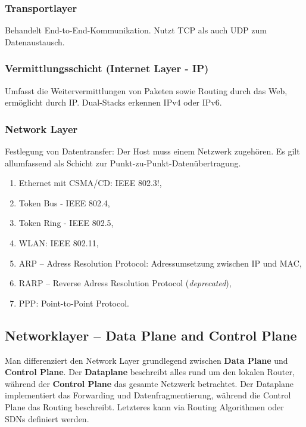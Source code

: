 \documentclass{scrartcl}
\begin{document}
    \subsubsection{Transportlayer}
    \label{TCP/IP:transport_layer}
    Behandelt End-to-End-Kommunikation. Nutzt TCP als auch UDP zum Datenaustausch. 
    
    \subsubsection{Vermittlungsschicht (Internet Layer - IP)}
    \label{TCP/IP:ip_layer}
    Umfasst die Weitervermittlungen von Paketen sowie Routing durch das Web, ermöglicht durch IP. 
    Dual-Stacks erkennen IPv4 oder IPv6.

    \subsubsection{Network Layer}
    \label{TCP/IP:network_layer}
    Festlegung von Datentransfer: Der Host muss einem Netzwerk zugehören.
    Es gilt allumfassend als Schicht zur Punkt-zu-Punkt-Datenübertragung.
    \begin{enumerate}
        \item Ethernet mit CSMA/CD: IEEE 802.3!,
        \item Token Bus - IEEE 802.4,
        \item Token Ring - IEEE 802.5,
        \item WLAN: IEEE 802.11,
        \item ARP -- Adress Resolution Protocol: Adressumsetzung zwischen IP und MAC,
        \item RARP -- Reverse Adress Resolution Protocol (\emph{deprecated}),
        \item PPP: Point-to-Point Protocol.
    \end{enumerate}

    \subsection{Networklayer -- Data Plane and Control Plane}
    \label{TCP/IP:data_plane_and_control_plane}
    Man differenziert den Network Layer grundlegend zwischen \textbf{Data Plane} und \textbf{Control Plane}.
    Der \textbf{Dataplane} beschreibt alles rund um den lokalen Router, 
    während der \textbf{Control Plane} das gesamte Netzwerk betrachtet.
    Der Dataplane implementiert das Forwarding und Datenfragmentierung, 
    während die Control Plane das Routing beschreibt. 
    Letzteres kann via Routing Algorithmen oder SDNs definiert werden.
    
\end{document}
